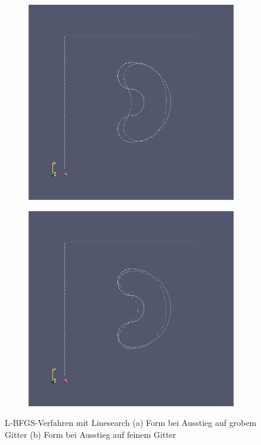 \begin{figure}
	\begin{subfigure}{0.5\textwidth}
	\centering
	\includegraphics[scale=0.25]{pic_brokendonut_bfgs_linesearch.jpg}
	\caption{}	
	\end{subfigure}
	\begin{subfigure}{0.5\textwidth}
	\centering
	\includegraphics[scale=0.25]{pic_brokendonut_bfgs_linesearch_fine.jpg}
	\caption{}	
	\end{subfigure}
\caption{L-BFGS-Verfahren mit Linesearch (a) Form bei Ausstieg auf grobem Gitter (b) Form bei Ausstieg auf feinem Gitter}
\label{brokendonut_bfgs_linesearch}
\end{figure}


